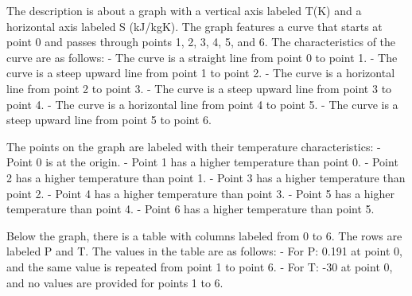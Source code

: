 The description is about a graph with a vertical axis labeled T(K) and a horizontal axis labeled S (kJ/kgK). The graph features a curve that starts at point 0 and passes through points 1, 2, 3, 4, 5, and 6. The characteristics of the curve are as follows:
- The curve is a straight line from point 0 to point 1.
- The curve is a steep upward line from point 1 to point 2.
- The curve is a horizontal line from point 2 to point 3.
- The curve is a steep upward line from point 3 to point 4.
- The curve is a horizontal line from point 4 to point 5.
- The curve is a steep upward line from point 5 to point 6.

The points on the graph are labeled with their temperature characteristics:
- Point 0 is at the origin.
- Point 1 has a higher temperature than point 0.
- Point 2 has a higher temperature than point 1.
- Point 3 has a higher temperature than point 2.
- Point 4 has a higher temperature than point 3.
- Point 5 has a higher temperature than point 4.
- Point 6 has a higher temperature than point 5.

Below the graph, there is a table with columns labeled from 0 to 6. The rows are labeled P and T. The values in the table are as follows:
- For P: 0.191 at point 0, and the same value is repeated from point 1 to point 6.
- For T: -30 at point 0, and no values are provided for points 1 to 6.